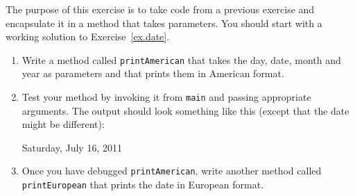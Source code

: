 \begin{exercise}

The purpose of this exercise is to take code from a previous exercise
and encapsulate it in a method that takes parameters.  You should
start with a working solution to Exercise~\ref{ex.date}.

\begin{enumerate}

\item Write a method called {\tt printAmerican}
that takes the day, date, month and year as parameters and that
prints them in American format.

\item Test your method by invoking it from {\tt main} and passing
appropriate arguments.  The output should look something like this
(except that the date might be different):
%
\begin{stdout}
Saturday, July 16, 2011
\end{stdout}
%
\item Once you have debugged {\tt printAmerican}, write another
method called {\tt printEuropean} that prints the date in
European format.

\end{enumerate}
\end{exercise}



